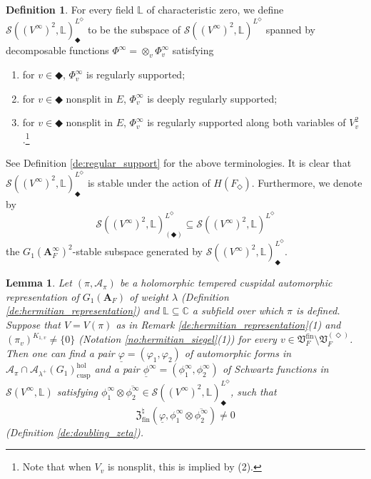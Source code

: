 \documentclass[12pt]{amsart}
\numberwithin{equation}{section}
\theoremstyle{plain}
\newtheorem{lem}[proposition]{Lemma}
\theoremstyle{definition}
\newtheorem{definition}[proposition]{Definition}
\theoremstyle{remark}
\renewcommand{\b}[1]{\mathbf{#1}}
\renewcommand{\c}[1]{\mathcal{#1}}
\renewcommand{\d}[1]{\mathbb{#1}}
\newcommand{\f}[1]{\mathfrak{#1}}
\renewcommand{\r}[1]{\mathrm{#1}}
\newcommand{\s}[1]{\mathscr{#1}}
\renewcommand{\(}{\left(}
\renewcommand{\)}{\right)}
\newcommand{\ol}[1]{\overline{#1}{}}
\newcommand{\ul}{\underline}
\newcommand{\bA}{\b A}
\newcommand{\cA}{\c A}
\newcommand{\dC}{\d C}
\newcommand{\dL}{\d L}
\newcommand{\fV}{\f V}
\newcommand{\fZ}{\f Z}
\newcommand{\sS}{\s S}
\newcommand{\cusp}{\r{cusp}}
\newcommand{\fin}{\r{fin}}
\newcommand{\hol}{\r{hol}}
\begin{document}
\begin{definition}\label{de:schwartz_special}
For every field $\dL$ of characteristic zero, we define $\sS((V^\infty)^2,\dL)^{L^\Diamond}_\Diamondblack$ to be the subspace of $\sS((V^\infty)^2,\dL)^{L^\Diamond}$ spanned by decomposable functions $\Phi^\infty=\otimes_v\Phi^\infty_v$ satisfying
\begin{enumerate}
  \item for $v\in\Diamondblack$, $\Phi^\infty_v$ is regularly supported;

  \item for $v\in\Diamondblack$ nonsplit in $E$, $\Phi^\infty_v$ is deeply regularly supported;

  \item for $v\in\Diamondblack$ nonsplit in $E$, $\Phi^\infty_v$ is regularly supported along both variables of $V_v^2$.\footnote{Note that when $V_v$ is nonsplit, this is implied by (2).}
\end{enumerate}
See Definition \ref{de:regular_support} for the above terminologies. It is clear that $\sS((V^\infty)^2,\dL)^{L^\Diamond}_\Diamondblack$ is stable under the action of $H(F_\Diamond)$. Furthermore, we denote by
\[
\sS((V^\infty)^2,\dL)^{L^\Diamond}_{(\Diamondblack)}\subseteq\sS((V^\infty)^2,\dL)^{L^\Diamond}
\]
the $G_1(\bA_F^\infty)^2$-stable subspace generated by $\sS((V^\infty)^2,\dL)^{L^\Diamond}_\Diamondblack$.
\end{definition}


\begin{lem}\label{le:abundance}
Let $(\pi,\cA_\pi)$ be a holomorphic tempered cuspidal automorphic representation of $G_1(\bA_F)$ of weight $\lambda$ (Definition \ref{de:hermitian_representation}) and $\dL\subseteq\dC$ a subfield over which $\pi$ is defined. Suppose that $V=V(\pi)$ as in Remark \ref{de:hermitian_representation}(1) and $(\pi_v)^{K_{1,v}}\neq\{0\}$ (Notation \ref{no:hermitian_siegel}(1)) for every $v\in\fV_F^{\fin}\setminus\fV_F^{(\Diamond)}$. Then one can find a pair $\ul\varphi=(\varphi_1,\varphi_2)$ of automorphic forms in $\cA_\pi\cap\cA_{\lambda^+}(G_1)_\cusp^\hol$ and a pair $\ul\phi^\infty=(\phi^\infty_1,\phi^\infty_2)$ of Schwartz functions in $\sS(V^\infty,\dL)$ satisfying $\phi^\infty_1\otimes\ol{\phi^\infty_2}\in\sS((V^\infty)^2,\dL)^{L^\Diamond}_\Diamondblack$, such that
\[
\fZ^\natural_\fin(\ul\varphi,\phi^\infty_1\otimes\ol{\phi^\infty_2})\neq 0
\]
(Definition \ref{de:doubling_zeta}).
\end{lem}
\end{document}
